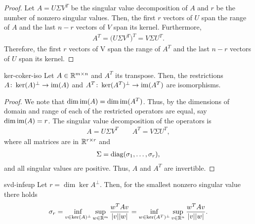 \begin{proof}
  Let $A=U\Sigma V^T$ be the singular value decomposition of $A$ and
  $r$ be the number of nonzero singular values. Then, the first $r$
  vectors of $U$ span the range of $A$ and the last $n-r$ vectors of
  $V$ span its kernel. Furthermore,
  \begin{gather}
    A^T = \bigl(U\Sigma V^T\bigr)^T = V \Sigma U^T.
  \end{gather}
  Therefore, the first $r$ vectors of V span the range of $A^T$ and
  the last $n-r$ vectors of $U$ span its kernel.
\end{proof}

\begin{Corollary}{ker-coker-iso}
  Let $A\in \mathbb R^{m\times n}$ and $A^T$ its transpose. Then, the
  restrictions $A\colon \operatorname{ker}(A)^\perp \to \operatorname{im}(A)$ and $A^T\colon
  \operatorname{ker}(A^T)^\perp \to \operatorname{im}(A^T)$ are isomorphisms.
\end{Corollary}

\begin{proof}
  We note that $\dim \operatorname{im}(A) = \dim \operatorname{im}(A^T)$. Thus, by
   the dimensions of domain and range of
  each of the restricted operators are equal, say $\dim \operatorname{im}(A) =
  r$. The singular value decomposition of the operators is
  \begin{gather*}
    A = U\Sigma V^T \qquad A^T = V\Sigma U^T,
  \end{gather*}
  where all matrices are in $\mathbb R^{r\times r}$ and
  \begin{gather*}
    \Sigma = \operatorname{diag}(\sigma_1,\dots,\sigma_r),
  \end{gather*}
  and all singular values are positive. Thus, $A$ and $A^T$ are invertible.
\end{proof}

\begin{Corollary}{svd-infsup}
  Let $r=\dim \ker A^\perp$. Then, for the smallest nonzero singular
  value there holds
  \begin{gather}
    \label{eq:infsup:6}
    \sigma_r
    = \inf_{v\in \operatorname{ker}(A)^\perp} \sup_{w\in \mathbb R^m} \frac{w^T A v}{\lvert v\rvert\lvert w\rvert}
    = \inf_{w\in \operatorname{ker}(A^T)^\perp} \sup_{v\in \mathbb R^n} \frac{w^T A v}{\lvert v\rvert\lvert w\rvert}.
  \end{gather}
\end{Corollary}

